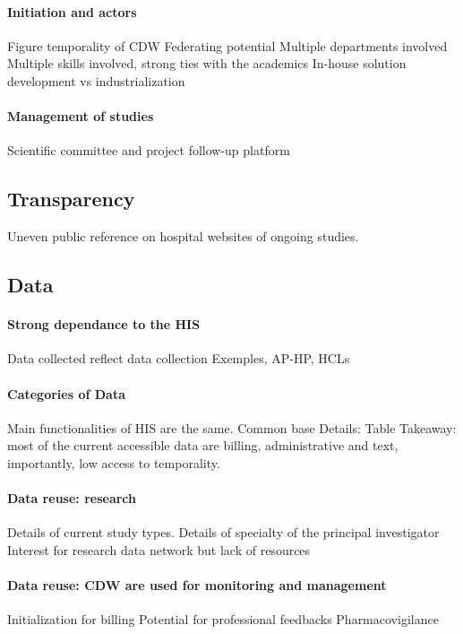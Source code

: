 \documentclass{report}
\begin{document}
\paragraph{Initiation and actors}
Figure temporality of CDW
Federating potential
Multiple departments involved
Multiple skills involved, strong ties with the academics
In-house solution development vs industrialization

\paragraph{Management of studies}

Scientific committee and project follow-up platform

\subsection{Transparency}\label{subsec:cdw:results:transparency}
Uneven public reference on hospital websites of ongoing studies.

\subsection{Data}\label{subsec:cdw:results:data}

\paragraph{Strong dependance to the HIS}

Data collected reflect data collection
Exemples, AP-HP, HCLs

\paragraph{Categories of Data}

Main functionalities of HIS are the same. Common base Details: Table Takeaway:
most of the current accessible data are billing, administrative and text,
importantly, low access to temporality.

\paragraph{Data reuse: research}
Details of current study types.
Details of specialty of the principal investigator
Interest for research data network but lack of resources

\paragraph{Data reuse: CDW are used for monitoring and management}
Initialization for billing
Potential for professional feedbacks
Pharmacovigilance
\end{document}
